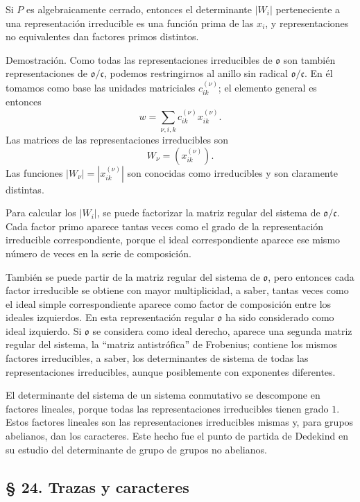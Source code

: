 \documentclass[11pt]{article}
\providecommand{\mo}{\mathfrak{o}}
\providecommand{\mc}{\mathfrak{c}}
\begin{document}
Si $P$ es algebraicamente cerrado, entonces el determinante $|W_i|$ perteneciente a una representación irreducible es una función prima de las $x_i$, y representaciones no equivalentes dan factores primos distintos.

Demostración. Como todas las representaciones irreducibles de $\mo$ son también representaciones de $\mo/\mc$, podemos restringirnos al anillo sin radical $\mo/\mc$. En él tomamos como base las unidades matriciales $c_{ik}^{(\nu)}$; el elemento general es entonces
\[
        w=\sum_{\nu,i,k} c_{ik}^{(\nu)}x_{ik}^{(\nu)}.
\]
Las matrices de las representaciones irreducibles son
\[
        W_\nu=(x_{ik}^{(\nu)}).
\]
Las funciones $|W_\nu|=|x_{ik}^{(\nu)}|$ son conocidas como irreducibles y son claramente distintas.

Para calcular los $|W_i|$, se puede factorizar la matriz regular del sistema de $\mo/\mc$. Cada factor primo aparece tantas veces como el grado de la representación irreducible correspondiente, porque el ideal correspondiente aparece ese mismo número de veces en la serie de composición.

También se puede partir de la matriz regular del sistema de $\mo$, pero entonces cada factor irreducible se obtiene con mayor multiplicidad, a saber, tantas veces como el ideal simple correspondiente aparece como factor de composición entre los ideales izquierdos. En esta representación regular $\mo$ ha sido considerado como ideal izquierdo. Si $\mo$ se considera como ideal derecho, aparece una segunda matriz regular del sistema, la ``matriz antistrófica'' de Frobenius; contiene los mismos factores irreducibles, a saber, los determinantes de sistema de todas las representaciones irreducibles, aunque posiblemente con exponentes diferentes.

El determinante del sistema de un sistema conmutativo se descompone en factores lineales, porque todas las representaciones irreducibles tienen grado $1$. Estos factores lineales son las representaciones irreducibles mismas y, para grupos abelianos, dan los caracteres. Este hecho fue el punto de partida de Dedekind en su estudio del determinante de grupo de grupos no abelianos.

\subsection*{§ 24. Trazas y caracteres}
\end{document}
